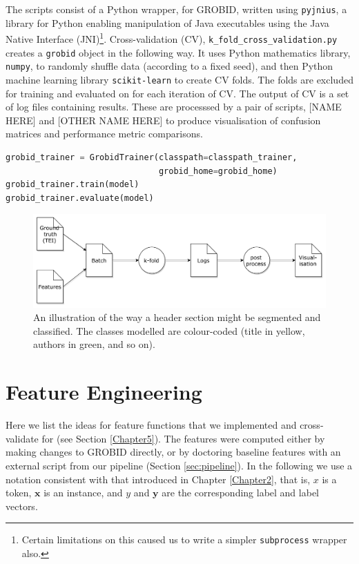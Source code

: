 The scripts consist of a Python wrapper,  for GROBID, written using \texttt{pyjnius}, a library for Python enabling manipulation of Java executables using the Java Native Interface (JNI)\footnote{Certain limitations on this caused us to write a simpler \texttt{subprocess} wrapper also.}. Cross-validation (CV), \texttt{k\_fold\_cross\_validation.py} creates a \texttt{grobid} object in the following way. It uses Python mathematics library, \texttt{numpy}, to randomly shuffle data (according to a fixed seed), and then Python machine learning library \texttt{scikit-learn} to create CV folds. The folds are excluded for training and evaluated on for each iteration of CV. The output of CV is a set of log files containing results. These are processsed by a pair of scripts, [NAME HERE] and [OTHER NAME HERE] to produce visualisation of confusion matrices and performance metric comparisons.
\\
\begin{lstlisting}[language=python, caption=blabla, label={lst:grobid}]
grobid_trainer = GrobidTrainer(classpath=classpath_trainer,
                               grobid_home=grobid_home)
grobid_trainer.train(model)
grobid_trainer.evaluate(model)
\end{lstlisting}

\begin{figure}[!ht]
\center
\includegraphics[width=\textwidth]{Figures/pipeline.pdf}
\caption{An illustration of the way a header section might be segmented and classified. The classes modelled are colour-coded (title in yellow, authors in green, and so on).}
\label{fig:grobid}
\end{figure}

\section{Feature Engineering}

Here we list the ideas for feature functions that we implemented and cross-validate for (see Section \ref{Chapter5}). The features were computed either by making changes to GROBID directly, or by doctoring baseline features with an external script from our pipeline (Section \ref{sec:pipeline}). In the following we use a notation consistent with that introduced in Chapter \ref{Chapter2}, that is, $x$ is a token, $\mathbf{x}$ is an instance, and $y$ and $\textbf{y}$ are the corresponding label and label vectors.

